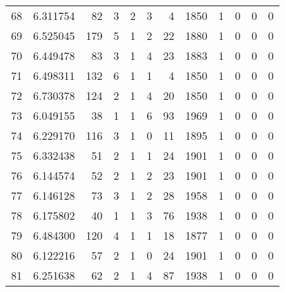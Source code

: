 \begin{tabular}{lrrrrrrrrrrr}
68  &  6.311754 &   82 &      3 &        2 &      3 &               4 &  1850 &               1 &               0 &               0 &               0 \\
69  &  6.525045 &  179 &      5 &        1 &      2 &              22 &  1880 &               1 &               0 &               0 &               0 \\
70  &  6.449478 &   83 &      3 &        1 &      4 &              23 &  1883 &               1 &               0 &               0 &               0 \\
71  &  6.498311 &  132 &      6 &        1 &      1 &               4 &  1850 &               1 &               0 &               0 &               0 \\
72  &  6.730378 &  124 &      2 &        1 &      4 &              20 &  1850 &               1 &               0 &               0 &               0 \\
73  &  6.049155 &   38 &      1 &        1 &      6 &              93 &  1969 &               1 &               0 &               0 &               0 \\
74  &  6.229170 &  116 &      3 &        1 &      0 &              11 &  1895 &               1 &               0 &               0 &               0 \\
75  &  6.332438 &   51 &      2 &        1 &      1 &              24 &  1901 &               1 &               0 &               0 &               0 \\
76  &  6.144574 &   52 &      2 &        1 &      2 &              23 &  1901 &               1 &               0 &               0 &               0 \\
77  &  6.146128 &   73 &      3 &        1 &      2 &              28 &  1958 &               1 &               0 &               0 &               0 \\
78  &  6.175802 &   40 &      1 &        1 &      3 &              76 &  1938 &               1 &               0 &               0 &               0 \\
79  &  6.484300 &  120 &      4 &        1 &      1 &              18 &  1877 &               1 &               0 &               0 &               0 \\
80  &  6.122216 &   57 &      2 &        1 &      0 &              24 &  1901 &               1 &               0 &               0 &               0 \\
81  &  6.251638 &   62 &      2 &        1 &      4 &              87 &  1938 &               1 &               0 &               0 &               0 \\

\end{tabular}

